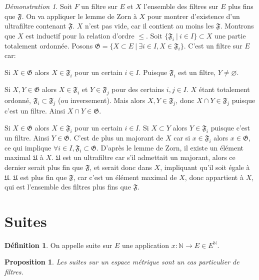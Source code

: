 \documentclass[a4paper, 11pt, french]{book}
\newenvironment{itemise}{\itemize}{\enditemize}
\theoremstyle{plain} %
\newtheorem{proposition}{Proposition}
\theoremstyle{definition} %
\newtheorem{definition}{Définition}
\theoremstyle{remark} %
\newtheorem*{demonstration}{Démonstration}
\newcommand{\1}{\mathds{1}}
\newcommand\vide{\varnothing}
\newcommand{\N}{\mathbb{N}}
\renewcommand{\frak}[1]{\mathfrak{#1}}
\newcommand\ens[2]{\{#1 \ |\ #2\}}
\begin{document}
\begin{demonstration}
	Soit $F$ un filtre sur $E$ et $X$ l'ensemble des filtres sur $E$ plus fins que $\frak{F}$.
	On va appliquer le lemme de Zorn à $X$ pour montrer d'existence d'un ultrafiltre contenant $\frak{F}$.
	$X$ n'est pas vide, car il contient au moins les $\frak{F}$.
	Montrons que $X$ est inductif pour la relation d'ordre $\leqslant$.
	Soit $\ens{\frak{F}_i}{i\in I}\subset X$ une partie totalement ordonnée.
	Posons $\frak{G}=\ens{X\subset E}{\exists i\in I, X\in\frak{F}_i}$.
	C'est un filtre sur $E$ car:
	\begin{itemise}
		\item Si $X\in\frak{G}$ alors $X\in\frak{F}_i$ pour un certain $i\in I$.
		Puisque $\frak{F}_i$ est un filtre, $Y\neq\vide$.
		\item Si $X, Y\in\frak{G}$ alors $X\in\frak{F}_i$ et $Y\in\frak{F}_j$ pour des certains $i, j\in I$.
		$X$ étant totalement ordonné, $\frak{F}_i\subset\frak{F}_j$ (ou inversement).
		Mais alors $X, Y\in\frak{F}_j$, donc $X\cap Y\in\frak{F}_j$ puisque c'est un filtre.
		Ainsi $X\cap Y\in\frak{G}$.
		\item Si $X\in\frak{G}$ alors $X\in\frak{F}_i$ pour un certain $i\in I$.
		Si $X\subset Y$ alors $Y\in\frak{F}_i$ puisque c'est un filtre.
		Ainsi $Y\in\frak{G}$.
	\end{itemise}
	C'est de plus un majorant de $X$ car si $x\in\frak{F}_i$ alors $x\in\frak{G}$, ce qui implique $\forall i\in I, \frak{F}_i\subset\frak{G}$.
	D'après le lemme de Zorn, il existe un élément maximal $\frak{U}$ à $X$.
	$\frak{U}$ est un ultrafiltre car s'il admettait un majorant, alors ce dernier serait plus fin que $\frak{F}$, et serait donc dans $X$, impliquant qu'il soit égale à $\frak{U}$.
	$\frak{U}$ est plus fin que $\frak{F}$, car c'est un élément maximal de $X$, donc appartient à $X$, qui est l'ensemble des filtres plus fins que $\frak{F}$.
\end{demonstration}

\section{Suites}

\begin{definition}
	On appelle suite sur $E$ une application $x:\N\rightarrow E\in E^\N$.
\end{definition}

\begin{proposition}
	Les suites sur un espace métrique sont un cas particulier de filtres.
\end{proposition}
\end{document}
